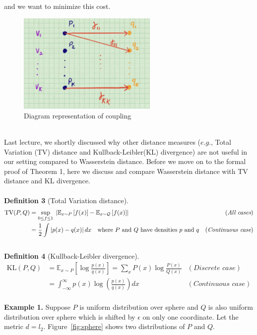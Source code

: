 \documentclass[11pt]{article}
\newcommand\bbE{\ensuremath{\mathbb{E}}} %
\newcommand{\abs}[1]{\left\lvert #1 \right\rvert} %
\newcommand{\1}{\mathbb{I}} %
\begin{document}
and we want to minimize this cost. 
\begin{figure}[h]
  \centering
    \includegraphics[width=0.6\textwidth]{gammaDiag.jpg}
     \caption{Diagram representation of coupling}
     \label{fig:coupling}
\end{figure}
\\
Last lecture, we shortly discussed why other distance measures ($e.g.$, Total Variation (TV) distance and Kullback-Leibler(KL) divergence) are not useful in our setting compared to Wasserstein distance. Before we move on to the formal proof of Theorem 1, here we discuss and compare Wasserstein distance with TV distance and KL divergence.\\
\\
\textbf{Definition 3} (Total Variation distance).
\begin{align*}
    \text{TV}(P,Q) &= \underset{0 \le f \le 1}{\sup} \hspace{0.25em}
                     \abs{ \bbE_{x \sim P} \left[ f(x) \right] -
                     \bbE_{x \sim \mathcal{Q}} \left[ f(x) \right]}
  &(\textit{All cases})\\
    &= \frac{1}{2} \int \abs{p(x) - q(x)} dx \quad \text{where $P$ and $Q$ have densities $p$ and $q$} &(\textit{Continuous case})
\end{align*}
\\
\textbf{Definition 4} (Kullback-Leibler divergence).
\begin{align*}
    \text{KL}(P,Q) &= \bbE_{x \sim P} \left[\log \frac{p(x)}{q(x)} \right] = \sum_x P(x) \log \frac{P(x)}{Q(x)} &(\textit{Discrete case})\\
    &= \int_{-\infty}^\infty p(x) \log \left( \frac{p(x)}{q(x)} \right) dx &(\textit{Continuous case})
\end{align*}
\\
\noindent \textbf{Example 1.} Suppose $P$ is uniform distribution over sphere and $Q$ is also uniform distribution over sphere which is shifted by $\epsilon$ on only one coordinate. Let the metric $d = l_2$. Figure~\ref{fig:sphere} shows two distributions of $P$ and $Q$.\\
\end{document}
